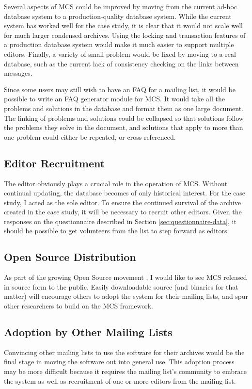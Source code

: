 Several aspects of MCS could be improved by moving from the current ad-hoc
database system to a production-quality database system. While the current
system has worked well for the case study, it is clear that it would not scale
well for much larger condensed archives. Using the locking and transaction
features of a production database system would make it much easier to support
multiple editors. Finally, a variety of small problem would be fixed by moving
to a real database, such as the current lack of consistency checking on the
links between messages.

Since some users may still wish to have an FAQ for a mailing list, it would be
possible to write an FAQ generator module for MCS. It would take all the
problems and solutions in the database and format them as one large document.
The linking of problems and solutions could be collapsed so that solutions
follow the problems they solve in the document, and solutions that apply to
more than one problem could either be repeated, or cross-referenced.

\subsection{Editor Recruitment}
\label{sec:editor-recruitment}
The editor obviously plays a crucial role in the operation of MCS. Without
continual updating, the database becomes of only historical interest. For the
case study, I acted as the sole editor. To ensure the continued
survival of the archive created in the case study, it will be necessary to
recruit other editors. Given the responses on the questionnaire described in
Section \ref{sec:questionnaire-data}, it should be possible to get volunteers
from the list to step forward as editors.

\subsection{Open Source Distribution}
\label{sec:open-source-dist}
As part of the growing Open Source movement \cite{open-source-website}, I would
like to see MCS released in source form to the public. Easily downloadable
source (and binaries for that matter) will encourage others to adopt the system
for their mailing lists, and spur other researchers to build on the MCS
framework.

\subsection{Adoption by Other Mailing Lists}
\label{sec:other-list-adoption}
Convincing other mailing lists to use the software for their archives would be
the final stage in moving the software out into general use. This adoption
process may be more difficult because it requires the mailing list's community
to embrace the system as well as recruitment of one or more editors from the
mailing list.

